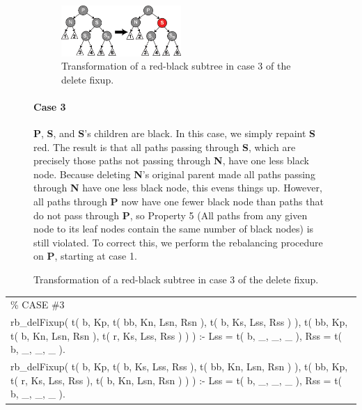 \documentclass{article}
\newenvironment{code}{\obeycr\begin{it}\nopagebreak\addvspace{1ex}\noindent\footnotesize\begin{tabular}{|p{0.95\textwidth}|}\hline}{\\\hline\end{tabular}\par\addvspace{1ex}\end{it}\restorecr}
\begin{document}
\begin{figure}[h]
  \begin{figure}
    \includegraphics[width=0.5\textwidth]{Red-black_tree_delete_case_3}
    \caption{Transformation of a red-black subtree in case 3 of the delete fixup.}
    \label{delFix3}
  \end{figure}
  \paragraph{Case 3}
\textbf{P}, \textbf{S}, and \textbf{S}'s children are black. In this case, we simply repaint \textbf{S} red. The result is that all paths passing through \textbf{S}, which are precisely those paths not passing through \textbf{N}, have one less black node. Because deleting \textbf{N}'s original parent made all paths passing through \textbf{N} have one less black node, this evens things up. However, all paths through \textbf{P} now have one fewer black node than paths that do not pass through \textbf{P}, so Property 5 (All paths from any given node to its leaf nodes contain the same number of black nodes) is still violated. To correct this, we perform the rebalancing procedure on \textbf{P}, starting at case 1.
\end{figure}

\begin{code}
\% CASE \#3\\
rb\_delFixup( t( b, Kp, t( bb, Kn, Lsn, Rsn ), t( b, Ks, Lss, Rss ) ),
\hspace{13ex}t( bb, Kp, t( b, Kn, Lsn, Rsn ), t( r, Ks, Lss, Rss ) ) ) :-
\hspace{2ex}Lss = t( b, \_, \_, \_ ),
\hspace{2ex}Rss = t( b, \_, \_, \_ ).\\
rb\_delFixup( t( b, Kp, t( b, Ks, Lss, Rss ), t( bb, Kn, Lsn, Rsn ) ), 
\hspace{13ex}t( bb, Kp, t( r, Ks, Lss, Rss ), t( b, Kn, Lsn, Rsn ) ) ) :-
\hspace{2ex}Lss = t( b, \_, \_, \_ ),
\hspace{2ex}Rss = t( b, \_, \_, \_ ).
\end{code}
\end{document}
